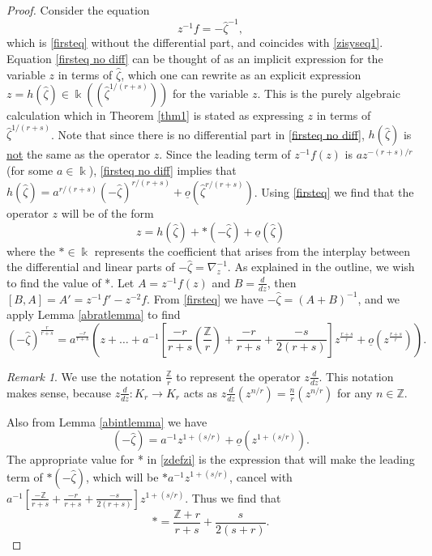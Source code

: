 \documentclass[11pt]{amsart}
\theoremstyle{plain}
\theoremstyle{definition}
\theoremstyle{remark}
\newtheorem*{remark}{Remark}
\def\z{\hat{\zeta}}
\def\lo{\underline{o}}
\begin{document}
\begin{proof}
Consider the equation
\begin{equation}\label{firsteq no diff}
z^{-1}f=-\z^{-1},
\end{equation}
 which is \eqref{firsteq} without the differential part, and coincides with \eqref{zisyseq1}.  Equation \eqref{firsteq no diff} can be thought of as an implicit expression for the variable $z$ in terms of $\z$, which one can rewrite as an explicit expression $z=h(\z)\in \Bbbk((\z^{1/(r+s)}))$ for the variable $z$. This is the purely algebraic calculation which in Theorem \ref{thm1} is stated as expressing $z$ in terms of $\z^{1/(r+s)}$.  Note that since there is no differential part in \eqref{firsteq no diff}, $h(\z)$ is \underline{not} the same as the operator $z$.  Since the leading term of $z^{-1}f(z)$ is $az^{-(r+s)/r}$ (for some $a\in\Bbbk$), \eqref{firsteq no diff} implies that $h(\z)=a^{r/(r+s)}(-\z)^{r/(r+s)}+\lo(\z^{r/(r+s)})$.  Using \eqref{firsteq} we find that the operator $z$ will be of the form
\begin{equation}\label{zdefzi}
    z=h(\z)+*(-\z)+\underline{o}(\z)
\end{equation}
where the $*\in\Bbbk$ represents the coefficient that arises from the interplay between the differential and linear parts of $-\z=\nabla_z^{-1}$.  As explained in the outline, we wish to find the value of *.  Let $A=z^{-1}f(z)$ and $B=\frac{d}{dz}$, then $[B,A]=A'=z^{-1}f'-z^{-2}f$. From \eqref{firsteq} we have $-\z=(A+B)^{-1}$, and we apply Lemma \ref{abratlemma} to find
\begin{equation*}
    (-\z)^{\frac{r}{r+s}}=a^{\frac{-r}{r+s}}\left(z+\dots+a^{-1}\left[\frac{-r}{r+s}\left(\frac{\mathbb{Z}}{r}\right)+\frac{-r}{r+s} + \frac{-s}{2(r+s)}\right]z^{\frac{r+s}{r}}+\underline{o}(z^{\frac{r+s}{r}})\right).
\end{equation*}
\begin{remark}  We use the notation $\frac{\mathbb{Z}}{r}$ to represent the operator $z\frac{d}{dz}$.  This notation makes sense, because $z\frac{d}{dz}\colon K_r\to K_r$ acts as $z\frac{d}{dz}(z^{n/r})=\frac{n}{r}(z^{n/r})$ for any $n\in\mathbb{Z}$.
\end{remark}
Also from Lemma \ref{abintlemma} we have
\begin{equation*}
    (-\z)=a^{-1}z^{1+(s/r)}+\underline{o}(z^{1+(s/r)}).
\end{equation*}
The appropriate value for * in \eqref{zdefzi} is the expression that will make the leading term of $*(-\z)$, which will be $*a^{-1}z^{1+(s/r)}$, cancel with $a^{-1}\left[\frac{-\mathbb{Z}}{r+s}+\frac{-r}{r+s} + \frac{-s}{2(r+s)}\right]z^{1+(s/r)}$. Thus we find that
\begin{equation}\label{starzi}
    *=\frac{\mathbb{Z}+r}{r+s}+\frac{s}{2(s+r)}.
\end{equation}


\end{proof}
\end{document}
